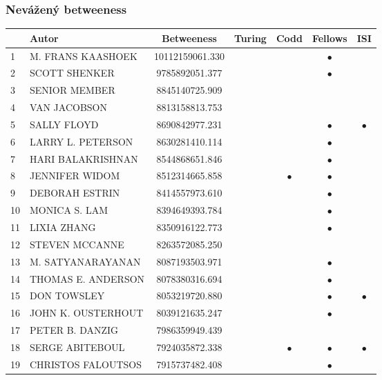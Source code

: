 \documentclass[12pt,titlepage]{report}
\begin{document}
\subsubsection{Nevážený betweeness}
\begin{center}
\begin{tabular}{|l|l|c|c|c|c|c|}
\hline
& {\bf Autor} & {\bf Betweeness} & {\bf Turing} & {\bf Codd} & {\bf Fellows} & {\bf ISI} \\
\hline
1  & M. FRANS KAASHOEK & 10112159061.330 & &         &$\bullet$&         \\
2  & SCOTT SHENKER & 9785892051.377      & &         &$\bullet$&         \\
3  & SENIOR MEMBER & 8845140725.909      & &         &         &         \\
4  & VAN JACOBSON & 8813158813.753       & &         &         &         \\
5  & SALLY FLOYD & 8690842977.231        & &         &$\bullet$&$\bullet$\\
6  & LARRY L. PETERSON & 8630281410.114  & &         &$\bullet$&         \\
7  & HARI BALAKRISHNAN & 8544868651.846  & &         &$\bullet$&         \\
8  & JENNIFER WIDOM & 8512314665.858     & &$\bullet$&$\bullet$&         \\
9  & DEBORAH ESTRIN & 8414557973.610     & &         &$\bullet$&         \\
10 & MONICA S. LAM & 8394649393.784      & &         &$\bullet$&         \\
11 & LIXIA ZHANG & 8350916122.773        & &         &$\bullet$&         \\
12 & STEVEN MCCANNE & 8263572085.250     & &         &         &         \\
13 & M. SATYANARAYANAN & 8087193503.971  & &         &$\bullet$&         \\
14 & THOMAS E. ANDERSON & 8078380316.694 & &         &$\bullet$&         \\
15 & DON TOWSLEY & 8053219720.880        & &         &$\bullet$&$\bullet$\\
16 & JOHN K. OUSTERHOUT & 8039121635.247 & &         &$\bullet$&         \\
17 & PETER B. DANZIG & 7986359949.439    & &         &         &         \\
18 & SERGE ABITEBOUL & 7924035872.338    & &$\bullet$&$\bullet$&$\bullet$\\
19 & CHRISTOS FALOUTSOS & 7915737482.408 & &         &$\bullet$&         \\

\end{tabular}
\end{center}
\end{document}
